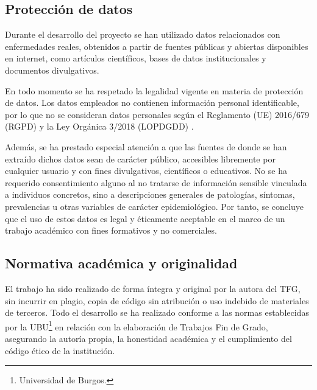 \subsection{Protección de datos}

Durante el desarrollo del proyecto se han utilizado datos relacionados con enfermedades reales, obtenidos a partir de fuentes públicas y abiertas disponibles en internet, como artículos científicos, bases de datos institucionales y documentos divulgativos. 

En todo momento se ha respetado la legalidad vigente en materia de protección de datos. Los datos empleados no contienen información personal identificable, por lo que no se consideran datos personales según el Reglamento (UE) 2016/679 (RGPD) \cite{ue2016rgpd} y la Ley Orgánica 3/2018 (LOPDGDD) \cite{lopdgdd2018}.

Además, se ha prestado especial atención a que las fuentes de donde se han extraído dichos datos sean de carácter público, accesibles libremente por cualquier usuario y con fines divulgativos, científicos o educativos. No se ha requerido consentimiento alguno al no tratarse de información sensible vinculada a individuos concretos, sino a descripciones generales de patologías, síntomas, prevalencias u otras variables de carácter epidemiológico.
Por tanto, se concluye que el uso de estos datos es legal y éticamente aceptable en el marco de un trabajo académico con fines formativos y no comerciales.

\subsection{Normativa académica y originalidad}

El trabajo ha sido realizado de forma íntegra y original por la autora del TFG, sin incurrir en plagio, copia de código sin atribución o uso indebido de materiales de terceros.
Todo el desarrollo se ha realizado conforme a las normas establecidas por la UBU\footnote{Universidad de Burgos.} en relación con la elaboración de Trabajos Fin de Grado, asegurando la autoría propia, la honestidad académica y el cumplimiento del código ético de la institución.






